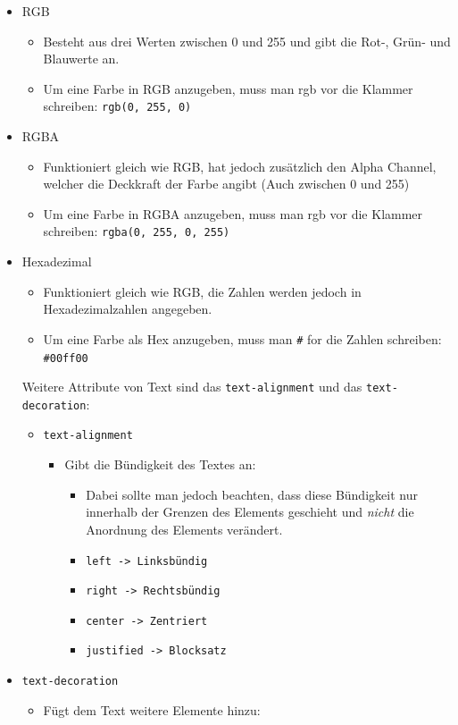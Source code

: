 \documentclass{article}
\begin{document}
	\begin{itemize}
		\item{RGB}
		\begin{itemize}
			\item{Besteht aus drei Werten zwischen 0 und 255 und gibt die Rot-, Grün- und Blauwerte an.}
			\item{Um eine Farbe in RGB anzugeben, muss man rgb vor die Klammer schreiben: \texttt{rgb(0, 255, 0)}}
		\end{itemize}
		\item{RGBA}
		\begin{itemize}
			\item{Funktioniert gleich wie RGB, hat jedoch zusätzlich den Alpha Channel, welcher die Deckkraft der Farbe angibt (Auch zwischen 0 und 255)}
			\item{Um eine Farbe in RGBA anzugeben, muss man rgb vor die Klammer schreiben: \texttt{rgba(0, 255, 0, 255)}}
		\end{itemize}
		\item{Hexadezimal}
		\begin{itemize}
			\item{Funktioniert gleich wie RGB, die Zahlen werden jedoch in Hexadezimalzahlen angegeben.}
			\item{Um eine Farbe als Hex anzugeben, muss man \verb|#| for die Zahlen schreiben: \verb|#00ff00|}
		\end{itemize}
		Weitere Attribute von Text sind das \texttt{text-alignment} und das \texttt{text-decoration}:
		\begin{itemize}
			\item{\texttt{text-alignment}}
			\begin{itemize}
				\item{Gibt die Bündigkeit des Textes an:}
				\begin{itemize}
					\item{Dabei sollte man jedoch beachten, dass diese Bündigkeit nur innerhalb der Grenzen des Elements geschieht und \textit{nicht} die Anordnung des Elements verändert.}
					\item{\texttt{left -> Linksbündig}}
					\item{\texttt{right -> Rechtsbündig}}
					\item{\texttt{center -> Zentriert}}
					\item{\texttt{justified -> Blocksatz}}
				\end{itemize}
			\end{itemize}
		\end{itemize}
			\item{\texttt{text-decoration}}
			\begin{itemize}
				\item{Fügt dem Text weitere Elemente hinzu:}
			\end{itemize}
		\end{itemize}
\end{document}
